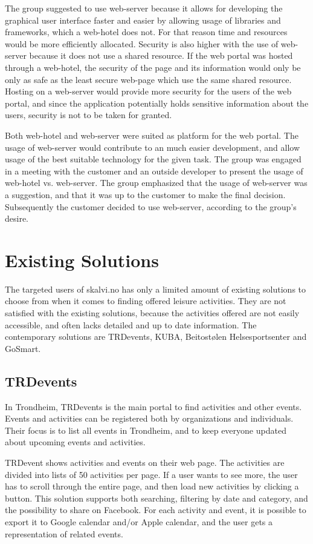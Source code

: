 The group suggested to use web-server because it allows for developing the graphical user interface faster and easier by allowing usage of libraries and frameworks, which a web-hotel does not. For that reason time and resources would be more efficiently allocated. Security is also higher with the use of web-server because it does not use a shared resource. If the web portal was hosted through a web-hotel, the security of the page and its information would only be only as  safe as the least secure web-page which use the same shared resource. Hosting on a web-server would provide more security for the users of the web portal, and since the application potentially holds sensitive information about the users, security is not to be taken for granted. 

Both web-hotel and web-server were suited as platform for the web portal. The usage of web-server would contribute to an much easier development, and allow usage of the best suitable technology for the given task. The group was engaged in a meeting with the customer and an outside developer to present the usage of web-hotel vs. web-server. The group emphasized that the usage of web-server was a suggestion, and that it was up to the customer to make the final decision. Subsequently the customer decided to use web-server, according to the group's desire.

\section{Existing Solutions}
\label{alternativeSolutions}
The targeted users of skalvi.no has only a limited amount of existing solutions to choose from when it comes to finding offered leisure activities. They are not satisfied with the existing solutions, because the activities offered are not easily accessible, and often lacks detailed and up to date information.  
The contemporary solutions are TRDevents, KUBA, Beitostølen Helsesportsenter and GoSmart.

\subsection{TRDevents}
In Trondheim, TRDevents \cite{TRDevents} is the main portal to find activities and other events. Events and activities can be registered both by organizations and individuals. Their focus is to list all events in Trondheim, and to keep everyone updated about upcoming events and activities. 

TRDevent shows activities and events on their web page. The activities are divided into lists of 50 activities per page. If a user wants to see more, the user has to scroll through the entire page, and then load new activities by clicking a button. 
This solution supports both searching, filtering by date and category, and the possibility to share on Facebook. For each activity and event, it is possible to export it to Google calendar and/or Apple calendar, and the user gets a representation of related events. 

